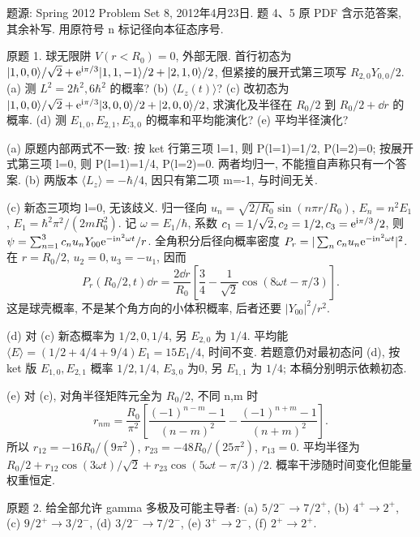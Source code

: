 题源: Spring 2012 Problem Set 8, 2012年4月23日. 题 4、5 原 PDF 含示范答案, 其余补写. 用原符号 n 标记径向本征态序号.
\begin{exercise}\label{ex:2202-8-1}
原题 1. 球无限阱 $V(r<R_0)=0$, 外部无限. 首行初态为 $|1,0,0\rangle/\sqrt2+\mathrm e^{\mathrm i\pi/3}|1,1,-1\rangle/2+|2,1,0\rangle/2$, 但紧接的展开式第三项写 $R_{2,0}Y_{0,0}/2$. (a) 测 $L^2=2\hbar^2,6\hbar^2$ 的概率? (b) $\langle L_z(t)\rangle$? (c) 改初态为 $|1,0,0\rangle/\sqrt2+\mathrm e^{\mathrm i\pi/3}|3,0,0\rangle/2+|2,0,0\rangle/2$, 求演化及半径在 $R_0/2$ 到 $R_0/2+\dd r$ 的概率. (d) 测 $E_{1,0},E_{2,1},E_{3,0}$ 的概率和平均能演化? (e) 平均半径演化?
\end{exercise}
\begin{solution}
(a) 原题内部两式不一致: 按 ket 行第三项 l=1, 则 P(l=1)=1/2, P(l=2)=0; 按展开式第三项 l=0, 则 P(l=1)=1/4, P(l=2)=0. 两者均归一, 不能擅自声称只有一个答案. (b) 两版本 $\langle L_z\rangle=-\hbar/4$, 因只有第二项 m=-1, 与时间无关.

(c) 新态三项均 l=0, 无该歧义. 归一径向 $u_n=\sqrt{2/R_0}\sin(n\pi r/R_0)$, $E_n=n^2E_1$, $E_1=\hbar^2\pi^2/(2mR_0^2)$. 记 $\omega=E_1/\hbar$, 系数 $c_1=1/\sqrt2,c_2=1/2,c_3=\mathrm e^{\mathrm i\pi/3}/2$, 则 $\psi=\sum_{n=1}^3c_nu_nY_{00}\mathrm e^{-\mathrm i n^2\omega t}/r$. 全角积分后径向概率密度 $P_r=|\sum_nc_nu_n\mathrm e^{-\mathrm i n^2\omega t}|^2$. 在 $r=R_0/2$, $u_2=0,u_3=-u_1$, 因而
\begin{equation}
 P_r(R_0/2,t)\dd r=\frac{2\dd r}{R_0}
 \left[\frac34-\frac1{\sqrt2}\cos(8\omega t-\pi/3)\right].
\end{equation}
这是球壳概率, 不是某个角方向的小体积概率, 后者还要 $|Y_{00}|^2/r^2$.

(d) 对 (c) 新态概率为 $1/2,0,1/4$, 另 $E_{2,0}$ 为 $1/4$. 平均能 $\langle E\rangle=(1/2+4/4+9/4)E_1=15E_1/4$, 时间不变. 若题意仍对最初态问 (d), 按 ket 版 $E_{1,0},E_{2,1}$ 概率 $1/2,1/4$, $E_{3,0}$ 为0, 另 $E_{1,1}$ 为 $1/4$; 本稿分别明示依赖初态.

(e) 对 (c), 对角半径矩阵元全为 $R_0/2$, 不同 n,m 时
\begin{equation}
 r_{nm}=\frac{R_0}{\pi^2}\left[\frac{(-1)^{n-m}-1}{(n-m)^2}-\frac{(-1)^{n+m}-1}{(n+m)^2}\right].
\end{equation}
所以 $r_{12}=-16R_0/(9\pi^2)$, $r_{23}=-48R_0/(25\pi^2)$, $r_{13}=0$. 平均半径为
$R_0/2+r_{12}\cos(3\omega t)/\sqrt2+r_{23}\cos(5\omega t-\pi/3)/2$. 概率干涉随时间变化但能量权重恒定.
\end{solution}
\begin{exercise}\label{ex:2202-8-2}
原题 2. 给全部允许 gamma 多极及可能主导者: (a) $5/2^-\to7/2^+$, (b) $4^+\to2^+$, (c) $9/2^+\to3/2^-$, (d) $3/2^-\to7/2^-$, (e) $3^+\to2^-$, (f) $2^+\to2^+$.
\end{exercise}
